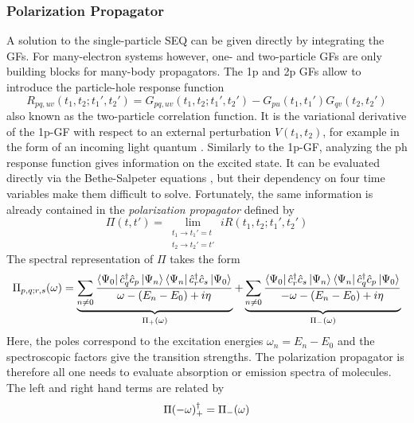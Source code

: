 \subsubsection{Polarization Propagator}

A solution to the single-particle SEQ can be given directly by integrating the GFs. For many-electron systems however, one- and two-particle GFs are only building blocks for many-body propagators. The 1p and 2p GFs allow to introduce the particle-hole response function 
\begin{equation}
R_{pq,uv}(t_1,t_2;t_1',t_2') = G_{pq,uv}(t_1,t_2;t_1',t_2') - G_{pu}(t_1,t_1')G_{qv}(t_2,t_2')
\end{equation}
\noindent also known as the two-particle correlation function. It is the variational derivative of the 1p-GF with respect to an external perturbation $V(t_1,t_2)$, for example in the form of an incoming light quantum \cite{Bay1962}. Similarly to the 1p-GF, analyzing the ph response function gives information on the excited state. It can be evaluated directly via the Bethe-Salpeter equations \cite{Nam1950,Sal1951}, but their dependency on four time variables make them difficult to solve. Fortunately, the same information is already contained in the \emph{polarization propagator} defined by
\begin{equation}
\Pi(t,t') = \lim_{\substack{t_1 \rightarrow t_1'=t \\
t_2 \rightarrow t_2' = t'}} iR(t_1,t_2;t_1',t_2')
\end{equation}  
\noindent The spectral representation of $\Pi$ takes the form
\begin{equation}
\Pi _{p,q;r,s}(\omega) = \underbrace{ \sum_{n \neq 0} \frac{ 
	\bra{\Psi_0} \hat{c}_q ^{\dagger} \hat{c}_p 		\ket{\Psi_n} \bra{\Psi_n} \hat{c}_r ^{\dagger} \hat{c}_s \ket{\Psi_0}
}{
	\omega - (E_n - E_0) + i \eta
} }_\text{$\Pi _+(\omega)$} + \underbrace{ \sum_{n \neq 0} \frac{ 
	\bra{\Psi_0} \hat{c}_r ^{\dagger} \hat{c}_s \ket{\Psi_n} \bra{\Psi_n} \hat{c}_q ^{\dagger} \hat{c}_p \ket{\Psi_0}
}{
	- \omega - (E_n - E_0) + i \eta
} }_\text{$\Pi _-(\omega)$}
\label{eq:POLPROP}
\end{equation}
\noindent Here, the poles correspond to the excitation energies $\omega_n = E_n - E_0$ and the spectroscopic factors give the transition strengths. The polarization propagator is therefore all one needs to evaluate absorption or emission spectra of molecules. The left and right hand terms are related by
\begin{equation}
\Pi(-\omega)_{+}^{\dagger} = \Pi_{-}(\omega)
\end{equation}

